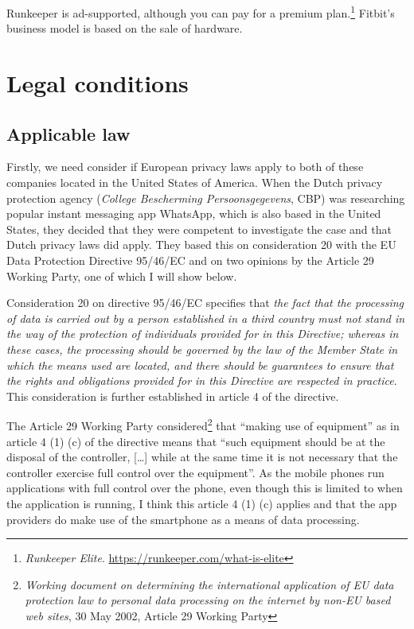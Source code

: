 \documentclass{article}
\begin{document}
Runkeeper is ad-supported, although you can pay for a premium plan.\footnote{\emph{Runkeeper Elite}. \url{https://runkeeper.com/what-is-elite}}
Fitbit's business model is based on the sale of hardware.

\section{Legal conditions}

\subsection{Applicable law}

Firstly, we need consider if European privacy laws apply to both of these companies located in the United States of America.
When the Dutch privacy protection agency (\emph{College Bescherming Persoonsgegevens}, CBP) was researching popular instant messaging app WhatsApp, which is also based in the United States, they decided that they were competent to investigate the case and that Dutch privacy laws did apply.
They based this on consideration 20 with the EU Data Protection Directive 95/46/EC and on two opinions by the Article 29 Working Party, one of which I will show below.

Consideration 20 on directive 95/46/EC specifies that \emph{the fact that the processing of data is carried out by a person established in a third country must not stand in the way of the protection of individuals provided for in this Directive; whereas in these cases, the processing should be governed by the law of the Member State in which the means used are located, and there should be guarantees to ensure that the rights and obligations provided for in this Directive are respected in practice}.
This consideration is further established in article 4 of the directive.

The Article 29 Working Party considered\footnote{\emph{Working document on determining the international application of EU data protection law to personal data processing on the internet by non-EU based web sites}, 30 May 2002, Article 29 Working Party} that ``making use of equipment'' as in article 4 (1) (c) of the directive means that ``such equipment should be at the disposal of the controller, [\ldots] while at the same time it is not necessary that the controller exercise full control over the equipment''.
As the mobile phones run applications with full control over the phone, even though this is limited to when the application is running, I think this article 4 (1) (c) applies and that the app providers do make use of the smartphone as a means of data processing.
\end{document}
